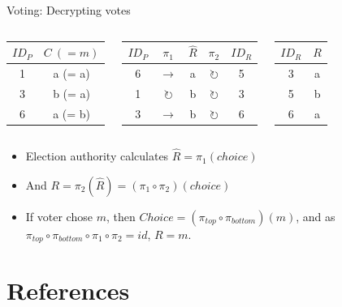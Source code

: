 \documentclass{beamer}
\begin{document}
\begin{frame}{Voting: Decrypting votes}
	\begin{columns}
		\begin{center}
			\begin{tabular}{|c|c|}
				\hline
				$ID_P$ & $C\ (= m)$ \\
				\hline
				1 & a (= a) \\
				3 & b (= a) \\
				6 & a (= b) \\
				\hline
			\end{tabular}
		\end{center}
		\begin{center}
			\begin{tabular}{|c|c|c|c|c|}
				\hline
				$ID_P$ & $\pi_1$ & $\hat{R}$ & $\pi_2$ & $ID_R$ \\
				\hline
				6 & $\rightarrow$       & a & $\circlearrowright$ & 5 \\
				1 & $\circlearrowright$ & b & $\circlearrowright$ & 3 \\
				3 & $\rightarrow$       & b & $\circlearrowright$ & 6 \\
				\hline
			\end{tabular}
		\end{center}
		\begin{center}
			\begin{tabular}{|c|c|}
				\hline
				$ID_R$ & $R$ \\
				\hline
				3 & a \\
				5 & b \\
				6 & a \\
				\hline
			\end{tabular}
		\end{center}
	\end{columns}

	\begin{itemize}
		\item Election authority calculates $\hat{R} = \pi_1(choice)$
		\item And $R = \pi_2(\hat{R}) = (\pi_1 \circ \pi_2)(choice)$
		\item If voter chose $m$, then $Choice = (\pi_{top} \circ
			\pi_{bottom})(m)$, and as $\pi_{top} \circ \pi_{bottom}
			\circ \pi_1 \circ \pi_2 = id$, $R = m$.
	\end{itemize}
\end{frame}

\section{References}
\end{document}
